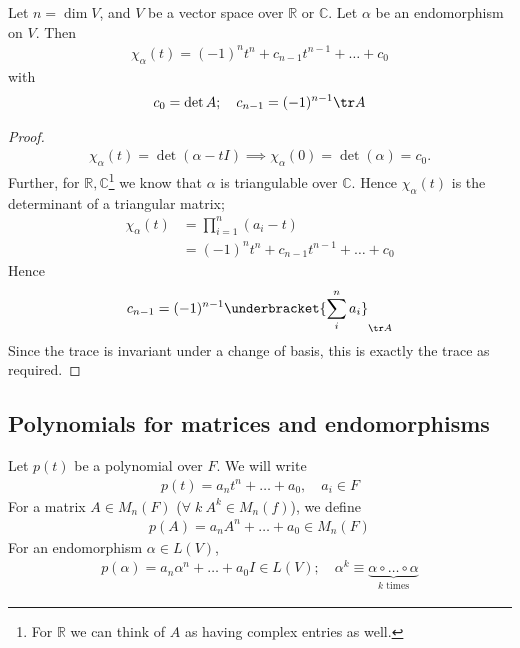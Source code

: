 \begin{lemma}
	Let $n = \dim V$, and $V$ be a vector space over $\mathbb R$ or $\mathbb C$.
	Let $\alpha$ be an endomorphism on $V$.
	Then
	\begin{align*}
		\chi_\alpha(t) = (-1)^n t^n + c_{n-1} t^{n-1} + \dots + c_0
	\end{align*}
	with
	\begin{align*}
		c_0 = \det A;\quad c_{n-1} = (-1)^{n-1} \tr A
	\end{align*}
\end{lemma}
\begin{proof}
	\begin{align*}
		\chi_\alpha(t) = \det(\alpha - t I) \implies \chi_\alpha(0) = \det(\alpha) = c_0.
	\end{align*}
	Further, for $\mathbb R, \mathbb C$\footnote{For $\mathbb{R}$ we can think of $A$ as having complex entries as well.} we know that $\alpha$ is triangulable over $\mathbb C$.
	Hence $\chi_\alpha(t)$ is the determinant of a triangular matrix;
	\begin{align*}
		\chi_\alpha(t) &= \prod_{i=1}^n (a_i - t) \\
		&= (-1)^n t^n + c_{n-1} t^{n-1} + \dots + c_0
	\end{align*}
	Hence
	\begin{align*}
		c_{n-1} = (-1)^{n-1} \underbracket{\sum_i^n  a_i}_{\tr A}
	\end{align*}
	Since the trace is invariant under a change of basis, this is exactly the trace as required.
\end{proof}

\subsection{Polynomials for matrices and endomorphisms}
Let $p(t)$ be a polynomial over $F$.
We will write
\begin{align*}
	p(t) = a_n t^n + \dots + a_0,\quad a_i \in F
\end{align*}
For a matrix $A \in M_n(F)$ ($\forall \; k \ A^k \in M_n(f)$), we define
\begin{align*}
	p(A) = a_n A^n + \dots + a_0 \in M_n(F)
\end{align*}
For an endomorphism $\alpha \in L(V)$,
\begin{align*}
	p(\alpha) = a_n \alpha^n + \dots + a_0 I \in L(V);\quad \alpha^k \equiv \underbrace{\alpha \circ \dots \circ \alpha}_{k \text{ times}}
\end{align*}

